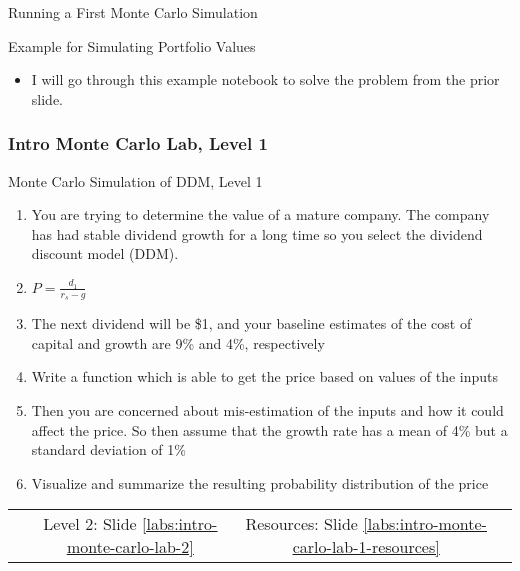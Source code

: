 \documentclass[handout, 11pt]{beamer}
\begin{document}
\begin{section}[Run MC]{Running a First Monte Carlo Simulation}
\begin{frame}
{\begin{block}{Example for Simulating Portfolio Values}
\begin{itemize}
\item I will go through this example notebook to solve the problem from the prior slide.
\end{itemize}
\end{block}
}
\end{frame}
\footnotesize
\begin{frame}
\frametitle{Intro Monte Carlo Lab, Level 1}
{
\begin{block}{Monte Carlo Simulation of DDM, Level 1}
\begin{enumerate}
\item You are trying to determine the value of a mature company. The company has had stable dividend growth for a long time so you select the dividend discount model (DDM).
\item $P = \frac{d_1}{r_s - g}$
\item The next dividend will be \$1, and your baseline estimates of the cost of capital and growth are 9\% and 4\%, respectively
\item Write a function which is able to get the price based on values of the inputs
\item Then you are concerned about mis-estimation of the inputs and how it could affect the price. So then assume that the growth rate has a mean of 4\% but a standard deviation of 1\%
\item Visualize and summarize the resulting probability distribution of the price
\end{enumerate}
\vfill
\begin{tabular*}{\textwidth}{@{\extracolsep{\fill}}cccc}
\toprule
\hfill & Level 2: Slide \textcolor{blue}{\underline{\ref{labs:intro-monte-carlo-lab-2}}} & Resources: Slide \textcolor{blue}{\underline{\ref{labs:intro-monte-carlo-lab-1-resources}}} & \hfill\\

\end{tabular*}
\end{block}
}
\label{labs:intro-monte-carlo-lab-1}
\end{frame}
\normalsize
\end{section}
\end{document}

